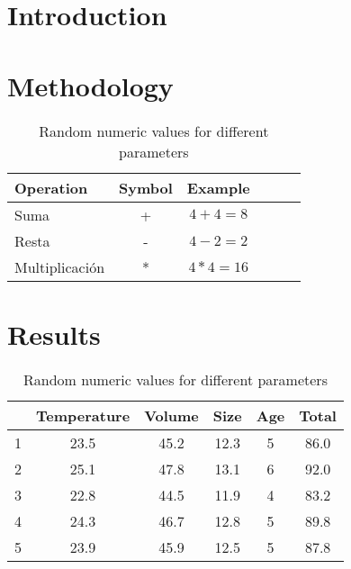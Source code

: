 \documentclass[a4paper,12pt,twoside]{article}
\begin{document}

\newpage

\pagestyle{toc}

\tableofcontents
\listoffigures
\listoftables
\lstlistoflistings
\pagebreak

\pagestyle{main}

\section{Introduction}

\pagebreak

\section{Methodology}

\begin{table}[H]
    \centering
    \begin{tabular}{|lccccc|}
        \hline
        \rowcolor{orange} \textbf{Operation} & \textbf{Symbol} & \textbf{Example} & & & \\ 
        \hline
        Suma & + & $4 + 4 = 8$ & & & \\
        \hline
        Resta & - & $4 - 2 = 2$ & & & \\
        \hline
        Multiplicación & * & $4 * 4 = 16$ & & & \\
        \hline
    \end{tabular}
    \caption{Random numeric values for different parameters}
    \label{tab:aritmetic_operations}
\end{table}

\pagebreak

\section{Results}

\begin{table}[H]
    \centering
    \begin{tabular}{|cccccc|}
        \hline
        \rowcolor{orange} & Temperature & Volume & Size & Age & Total \\
        \hline
        1 & 23.5 & 45.2 & 12.3 & 5 & 86.0 \\
        \hline
        2 & 25.1 & 47.8 & 13.1 & 6 & 92.0 \\
        \hline
        3 & 22.8 & 44.5 & 11.9 & 4 & 83.2 \\
        \hline
        4 & 24.3 & 46.7 & 12.8 & 5 & 89.8 \\
        \hline
        5 & 23.9 & 45.9 & 12.5 & 5 & 87.8 \\
        \hline
    \end{tabular}
    \caption{Random numeric values for different parameters}
    \label{tab:random_values}
\end{table}
\end{document}
